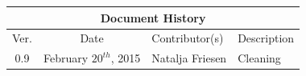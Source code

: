 \documentclass[a4paper]{article}
\begin{document}
\begin{center}
  \begin{tabular}{|c|c|p{6cm}|p{7cm}|}
    \hline
    \multicolumn{4}{|c|}{\cellcolor{CornflowerBlue}Document History} \\
    \hline
    \rowcolor{LightSteelBlue}
    Ver. & Date & Contributor(s) & Description \\     \hline
    0.9 & February $20^{th}$, 2015 & Natalja Friesen & Cleaning \\     \hline
   \end{tabular}
\end{center}

\newpage

\tableofcontents
\newpage

\listoffigures
\listoftables
\newpage





\clearpage

\clearpage

\clearpage

\clearpage





\appendix
\end{document}
